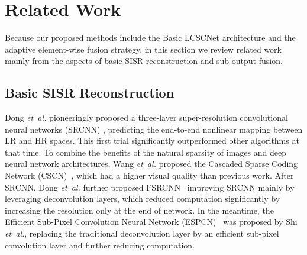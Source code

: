 \documentclass[journal]{IEEEtran}
\begin{document}
\section{Related Work}\label{s:s_2}


Because our proposed methods include the Basic LCSCNet architecture and the adaptive element-wise fusion strategy, in this section we review related work mainly from the aspects of basic SISR reconstruction and sub-output fusion. 

\subsection{Basic SISR Reconstruction} 

Dong \emph{et~al.} pioneeringly proposed a three-layer super-resolution convolutional neural networks (SRCNN) \cite{dong2014learning}, predicting the end-to-end nonlinear mapping between LR and HR spaces. This first trial significantly outperformed other algorithms at that time. To combine the benefits of the natural sparsity of images and deep neural network architectures, Wang \emph{et~al.} proposed the Cascaded Sparse Coding Network (CSCN)~\cite{wang2015deep}, which had a higher visual quality than previous work. After SRCNN, Dong \emph{et~al.} further proposed FSRCNN~\cite{dong2016accelerating} improving SRCNN mainly by leveraging deconvolution layers, which reduced computation significantly by increasing the resolution only at the end of network. In the meantime, the Efficient Sub-Pixel Convolution Neural Network (ESPCN)~\cite{shi2016real} was proposed by Shi \emph{et~al.}, replacing the traditional deconvolution layer by an efficient sub-pixel convolution layer and further reducing computation. 
\end{document}
